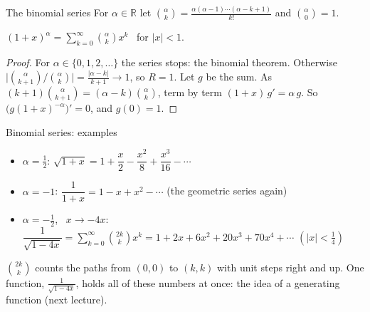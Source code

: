 \documentclass{wosm-slides}
\newcommand{\R}{\mathbb{R}}
\begin{document}
\begin{frame}{The binomial series}
  For $\alpha \in \R$ let
  $\binom{\alpha}{k} = \frac{\alpha (\alpha - 1) \cdots (\alpha - k + 1)}{k!}$ and $\binom{\alpha}{0} = 1$.
  \begin{theorem}
    $\displaystyle (1 + x)^\alpha = \sum_{k=0}^\infty \binom{\alpha}{k} x^k$ \ for $|x| < 1$.
  \end{theorem}
  \pause
  \begin{proof}
    For $\alpha \in \{0, 1, 2, \dots\}$ the series stops: the binomial theorem. Otherwise
    $\bigl|\binom{\alpha}{k+1} / \binom{\alpha}{k}\bigr| = \frac{|\alpha - k|}{k+1} \to 1$, so $R = 1$.
    Let $g$ be the sum. As $(k+1)\binom{\alpha}{k+1} = (\alpha - k)\binom{\alpha}{k}$, term by term
    $(1 + x)\, g' = \alpha\, g$. So $\bigl(g (1+x)^{-\alpha}\bigr)' = 0$, and $g(0) = 1$.
  \end{proof}
\end{frame}

\begin{frame}{Binomial series: examples}
  \begin{itemize}
    \item $\alpha = \frac12$: \quad
      $\sqrt{1 + x} = 1 + \dfrac{x}{2} - \dfrac{x^2}{8} + \dfrac{x^3}{16} - \cdots$
    \item $\alpha = -1$: \quad
      $\dfrac{1}{1 + x} = 1 - x + x^2 - \cdots$ \quad (the geometric series again)
    \item $\alpha = -\frac12$, \ $x \to -4x$: \quad
      $\dfrac{1}{\sqrt{1 - 4x}} = \sum_{k=0}^\infty \binom{2k}{k} x^k
       = 1 + 2x + 6x^2 + 20x^3 + 70x^4 + \cdots$ \quad $(|x| < \frac14)$
  \end{itemize}
  \pause
  \begin{remark}
    $\binom{2k}{k}$ counts the paths from $(0, 0)$ to $(k, k)$ with unit steps right and up.
    One function, $\frac{1}{\sqrt{1 - 4x}}$, holds all of these numbers at once: the idea of a
    generating function (next lecture).
  \end{remark}
\end{frame}
\end{document}
